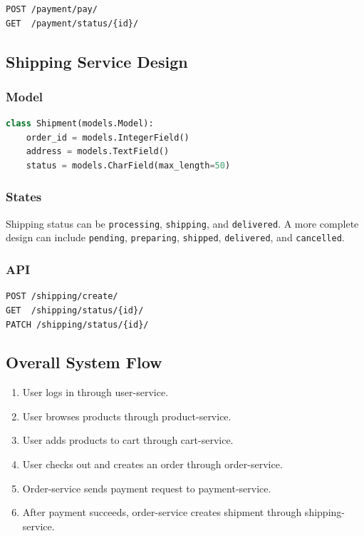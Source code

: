 \documentclass[12pt,a4paper]{article}
\newcommand{\codepath}[1]{\texttt{#1}}
\begin{document}
\begin{lstlisting}[caption={Payment service API.}]
POST /payment/pay/
GET  /payment/status/{id}/
\end{lstlisting}

\subsection{Shipping Service Design}

\subsubsection{Model}

\begin{lstlisting}[language=Python,caption={Shipping service model.}]
class Shipment(models.Model):
    order_id = models.IntegerField()
    address = models.TextField()
    status = models.CharField(max_length=50)
\end{lstlisting}

\subsubsection{States}

Shipping status can be \codepath{processing}, \codepath{shipping}, and \codepath{delivered}. A more complete design can include \codepath{pending}, \codepath{preparing}, \codepath{shipped}, \codepath{delivered}, and \codepath{cancelled}.

\subsubsection{API}

\begin{lstlisting}[caption={Shipping service API.}]
POST /shipping/create/
GET  /shipping/status/{id}/
PATCH /shipping/status/{id}/
\end{lstlisting}

\subsection{Overall System Flow}

\begin{enumerate}[label=\arabic*.]
    \item User logs in through user-service.
    \item User browses products through product-service.
    \item User adds products to cart through cart-service.
    \item User checks out and creates an order through order-service.
    \item Order-service sends payment request to payment-service.
    \item After payment succeeds, order-service creates shipment through shipping-service.
\end{enumerate}
\end{document}
